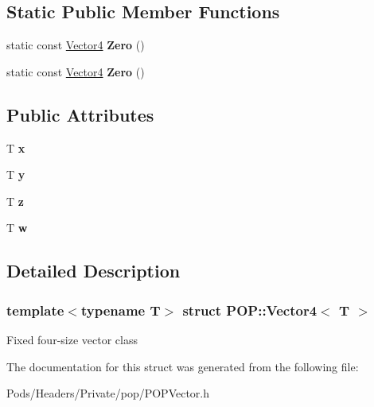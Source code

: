\subsection*{Static Public Member Functions}
\begin{DoxyCompactItemize}
\item 
\mbox{\label{struct_p_o_p_1_1_vector4_a3739a2db4974fe413528430e0b4d4c3f}} 
static const \mbox{\hyperlink{struct_p_o_p_1_1_vector4}{Vector4}} {\bfseries Zero} ()
\item 
\mbox{\label{struct_p_o_p_1_1_vector4_a3739a2db4974fe413528430e0b4d4c3f}} 
static const \mbox{\hyperlink{struct_p_o_p_1_1_vector4}{Vector4}} {\bfseries Zero} ()
\end{DoxyCompactItemize}
\subsection*{Public Attributes}
\begin{DoxyCompactItemize}
\item 
\mbox{\label{struct_p_o_p_1_1_vector4_a367b19c0c67ac0662b2c5aa1e5e548bf}} 
T {\bfseries x}
\item 
\mbox{\label{struct_p_o_p_1_1_vector4_a8d27e7997ab92fb92d38797fe23ecbd3}} 
T {\bfseries y}
\item 
\mbox{\label{struct_p_o_p_1_1_vector4_ae37f8caa5056e8d4dc50f09d4ea6cb8e}} 
T {\bfseries z}
\item 
\mbox{\label{struct_p_o_p_1_1_vector4_a80a15ee3f210d30ea9241ede5b19ec73}} 
T {\bfseries w}
\end{DoxyCompactItemize}


\subsection{Detailed Description}
\subsubsection*{template$<$typename T$>$\newline
struct P\+O\+P\+::\+Vector4$<$ T $>$}

Fixed four-\/size vector class 

The documentation for this struct was generated from the following file\+:\begin{DoxyCompactItemize}
\item 
Pods/\+Headers/\+Private/pop/P\+O\+P\+Vector.\+h\end{DoxyCompactItemize}
